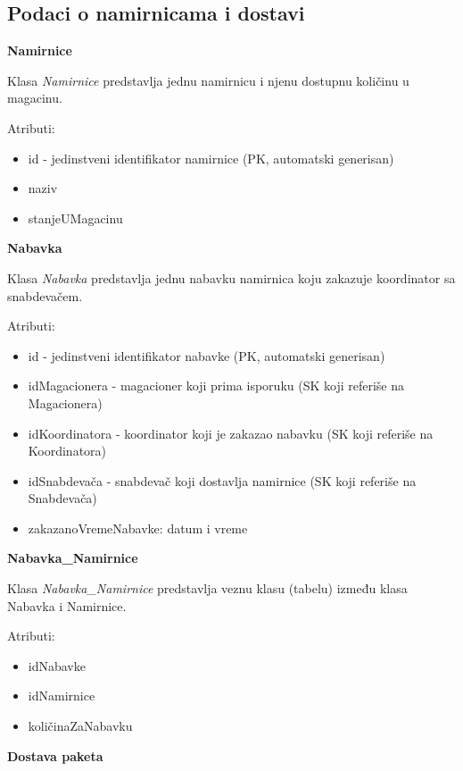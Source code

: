 \subsection{Podaci o namirnicama i dostavi}

\textbf{\large Namirnice}
\vspace{0.3cm}

Klasa \textit{Namirnice} predstavlja jednu namirnicu i njenu dostupnu količinu u magacinu.

Atributi:
\begin{itemize}
    \item id - jedinstveni identifikator namirnice (PK, automatski generisan)
    \item naziv 
    \item stanjeUMagacinu
\end{itemize}

\textbf{\large Nabavka}
\vspace{0.3cm}

Klasa \textit{Nabavka} predstavlja jednu nabavku namirnica koju zakazuje koordinator sa snabdevačem.

Atributi:
\begin{itemize}
    \item id - jedinstveni identifikator nabavke (PK, automatski generisan)
    \item idMagacionera - magacioner koji prima isporuku (SK koji referiše na Magacionera)
    \item idKoordinatora - koordinator koji je zakazao nabavku (SK koji referiše na Koordinatora)
    \item idSnabdevača - snabdevač koji dostavlja namirnice (SK koji referiše na Snabdevača) 
    \item zakazanoVremeNabavke: datum i vreme
\end{itemize}

\textbf{\large Nabavka\_Namirnice}
\vspace{0.3cm}

Klasa \textit{Nabavka\_Namirnice} predstavlja veznu klasu (tabelu) između klasa Nabavka i Namirnice.

Atributi:
\begin{itemize}
    \item idNabavke
    \item idNamirnice
    \item količinaZaNabavku
\end{itemize}

\textbf{\large Dostava paketa}
\vspace{0.3cm}

